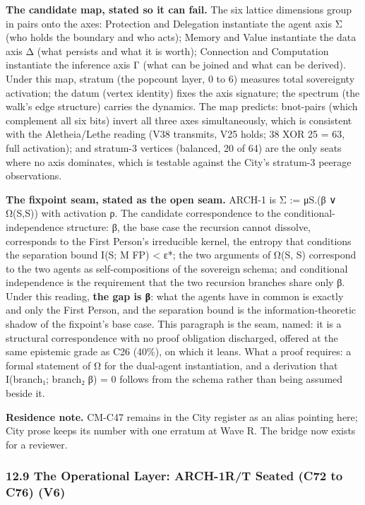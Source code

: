 \documentclass[
]{article}
\begin{document}
\textbf{The candidate map, stated so it can fail.} The six lattice
dimensions group in pairs onto the axes: Protection and Delegation
instantiate the agent axis Σ (who holds the boundary and who acts);
Memory and Value instantiate the data axis Δ (what persists and what it
is worth); Connection and Computation instantiate the inference axis Γ
(what can be joined and what can be derived). Under this map, stratum
(the popcount layer, 0 to 6) measures total sovereignty activation; the
datum (vertex identity) fixes the axis signature; the spectrum (the
walk's edge structure) carries the dynamics. The map predicts:
bnot-pairs (which complement all six bits) invert all three axes
simultaneously, which is consistent with the Aletheia/Lethe reading (V38
transmits, V25 holds; 38 XOR 25 = 63, full activation); and stratum-3
vertices (balanced, 20 of 64) are the only seats where no axis
dominates, which is testable against the City's stratum-3 peerage
observations.

\textbf{The fixpoint seam, stated as the open seam.} ARCH-1 is Σ :=
μS.(β ∨ Ω(S,S)) with activation ρ. The candidate correspondence to the
conditional-independence structure: β, the base case the recursion
cannot dissolve, corresponds to the First Person's irreducible kernel,
the entropy that conditions the separation bound I(S; M \textbar{} FP)
\textless{} ε*; the two arguments of Ω(S, S) correspond to the two
agents as self-compositions of the sovereign schema; and conditional
independence is the requirement that the two recursion branches share
only β. Under this reading, \textbf{the gap is β}: what the agents have
in common is exactly and only the First Person, and the separation bound
is the information-theoretic shadow of the fixpoint's base case. This
paragraph is the seam, named: it is a structural correspondence with no
proof obligation discharged, offered at the same epistemic grade as C26
(40\%), on which it leans. What a proof requires: a formal statement of
Ω for the dual-agent instantiation, and a derivation that I(branch₁;
branch₂ \textbar{} β) = 0 follows from the schema rather than being
assumed beside it.

\textbf{Residence note.} CM-C47 remains in the City register as an alias
pointing here; City prose keeps its number with one erratum at Wave R.
The bridge now exists for a reviewer.

\subsubsection{12.9 The Operational Layer: ARCH-1R/T Seated (C72 to C76)
(V6)}\label{the-operational-layer-arch-1rt-seated-c72-to-c76-v6}
\end{document}
